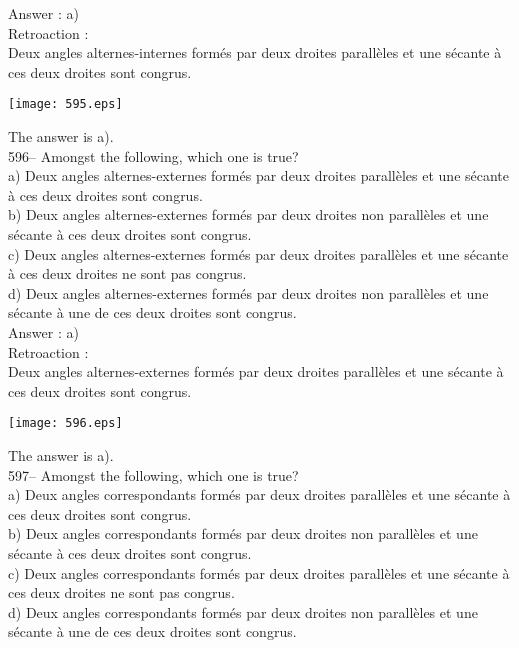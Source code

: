 ﻿\documentclass[letterpaper, 12pt]{article}
\begin{document}
Answer : a)\\

Retroaction : \\
Deux angles alternes-internes form\'es par deux droites parall\`eles
et une s\'ecante \`a ces deux droites sont congrus.   \begin{center}
    \texttt{[image: 595.eps]}
    \end{center}  The answer is a).\\

596-- Amongst the following, which one is true?\\
a) Deux angles alternes-externes form\'es par deux droites parall\`eles et
une s\'ecante \`a ces deux droites sont congrus.\\
b) Deux angles alternes-externes form\'es par deux droites non parall\`eles
et une s\'ecante \`a ces deux droites sont congrus.\\
c) Deux angles alternes-externes form\'es par deux droites parall\`eles et
une s\'ecante \`a ces deux droites ne sont pas congrus.\\
d) Deux angles alternes-externes form\'es par deux droites non parall\`eles
et une s\'ecante \`a une de ces deux droites sont congrus.\\

Answer : a)\\

Retroaction : \\
Deux angles alternes-externes form\'es par deux droites parall\`eles
et une s\'ecante \`a ces deux droites sont congrus.   \begin{center}
    \texttt{[image: 596.eps]}
    \end{center}  The answer is a).\\

597-- Amongst the following, which one is true?\\
a) Deux angles correspondants form\'es par deux droites parall\`eles et une
s\'ecante \`a ces deux droites sont congrus.\\
b) Deux angles correspondants form\'es par deux droites non parall\`eles et
une s\'ecante \`a ces deux droites sont congrus.\\
c) Deux angles correspondants form\'es par deux droites parall\`eles et une
s\'ecante \`a ces deux droites ne sont pas congrus.\\
d) Deux angles correspondants form\'es par deux droites non parall\`eles et
une s\'ecante \`a une de ces deux droites sont congrus.\\
\end{document}
